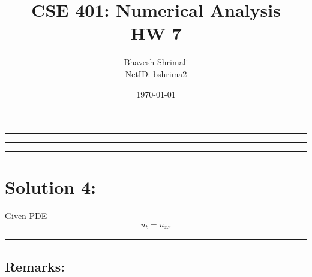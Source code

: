 
\title{\bf CSE 401: Numerical Analysis \\ HW 7}
\author{Bhavesh Shrimali \\ NetID: bshrima2}
\date{\today}
\titlespacing*{\title}{-2ex}{*-2ex}{-2ex}

\maketitle \hrule\hrule\hrule
\section*{Solution 4: }
Given PDE
\begin{align}
u_{t}
=
u_{xx}
\end{align}\hrule
\subsection*{Remarks: }
